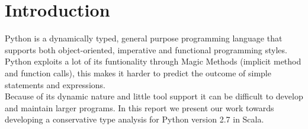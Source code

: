 \chapter{Introduction}
Python is a dynamically typed, general purpose programming language that supports both object-oriented, imperative and functional programming styles. Python exploits a lot of its funtionality through Magic Methods (implicit method and function calls), this makes it harder to predict the outcome of simple statements and expressions.  \\
Because of its dynamic nature and little tool support it can be difficult to develop and maintain larger programs. In this report we present our work towards developing a conservative type analysis for Python version 2.7 in Scala.